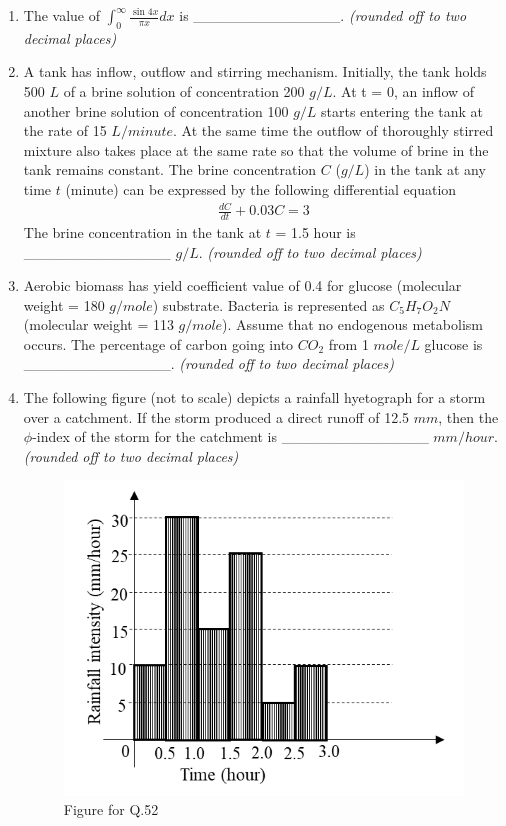 \documentclass[journal]{IEEEtran}
\begin{document}
\begin{enumerate}[resume]
\item The value of $\int_0^\infty \frac{\sin 4x}{\pi x} dx$ is \_\_\_\_\_\_\_\_\_\_\_\_\_\_. \textit{(rounded off to two decimal places)}
\hfill{}

\item A tank has inflow, outflow and stirring mechanism. Initially, the tank holds 500 $L$ of a brine solution of concentration 200 $g/L$. At t = 0, an inflow of another brine solution of concentration 100 $g/L$ starts entering the tank at the rate of 15 $L/minute$. At the same time the outflow of thoroughly stirred mixture also takes place at the same rate so that the volume of brine in the tank remains constant. The brine concentration $C$ ($g/L$) in the tank at any time $t$ (minute) can be expressed by the following differential equation 
\begin{align*}
\frac{dC}{dt} + 0.03 C = 3
\end{align*}
The brine concentration in the tank at $t$ = 1.5 hour is \_\_\_\_\_\_\_\_\_\_\_\_\_\_ $g/L$. \textit{(rounded off to two decimal places)}
\hfill{}

\item Aerobic biomass has yield coefficient value of 0.4 for glucose (molecular weight = 180 $g/mole$) substrate. Bacteria is represented as $C_5H_7O_2N$ (molecular weight = 113 $g/mole$). Assume that no endogenous metabolism occurs. The percentage of carbon going into $CO_2$ from 1 $mole/L$ glucose is \_\_\_\_\_\_\_\_\_\_\_\_\_\_. \textit{(rounded off to two decimal places)} \hfill{}

\item The following figure (not to scale) depicts a rainfall hyetograph for a storm over a catchment. If the storm produced a direct runoff of 12.5 $mm$, then the $\phi$-index of the storm for the catchment is \_\_\_\_\_\_\_\_\_\_\_\_\_\_ $mm/hour$. \textit{(rounded off to two decimal places)} \hfill{}
\begin{figure}[H]
    \centering
    \includegraphics[width=0.6\columnwidth]{figs/fig14.png}
    \caption*{Figure for Q.52}
\end{figure}


\end{enumerate}
\end{document}
